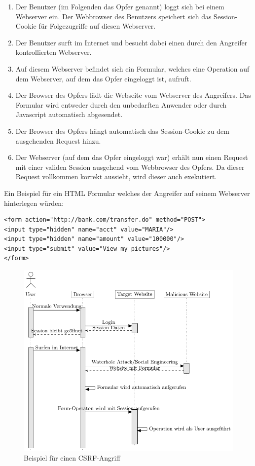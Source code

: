 \begin{enumerate}
\item Der Benutzer (im Folgenden das Opfer genannt) loggt sich bei einem Webserver ein. Der Webbrowser des Benutzers speichert sich das Session-Cookie für Folgezugriffe auf diesen Webserver.
\item Der Benutzer surft im Internet und besucht dabei einen durch den Angreifer kontrollierten Webserver.
\item Auf diesem Webserver befindet sich ein Formular, welches eine Operation auf dem Webserver, auf dem das Opfer eingeloggt ist, aufruft.
\item Der Browser des Opfers lädt die Webseite vom Webserver des Angreifers. Das Formular wird entweder durch den unbedarften Anwender oder durch Javascript automatisch abgesendet.
\item Der Browser des Opfers hängt automatisch das Session-Cookie zu dem ausgehenden Request hinzu.
\item Der Webserver (auf dem das Opfer eingeloggt war) erhält nun einen Request mit einer validen Session ausgehend vom Webbrowser des Opfers. Da dieser Request vollkommen korrekt aussieht, wird dieser auch exekutiert.
\end{enumerate}

Ein Beispiel für ein HTML Formular welches der Angreifer auf seinem Webserver hinterlegen würden:

\begin{verbatim}
<form action="http://bank.com/transfer.do" method="POST">
<input type="hidden" name="acct" value="MARIA"/>
<input type="hidden" name="amount" value="100000"/>
<input type="submit" value="View my pictures"/>
</form>
\end{verbatim}

\begin{figure}
	\includegraphics[width=\textwidth]{graphs/csrf.pdf}
	\centering
	\caption{Beispiel für einen CSRF-Angriff}
\end{figure}

